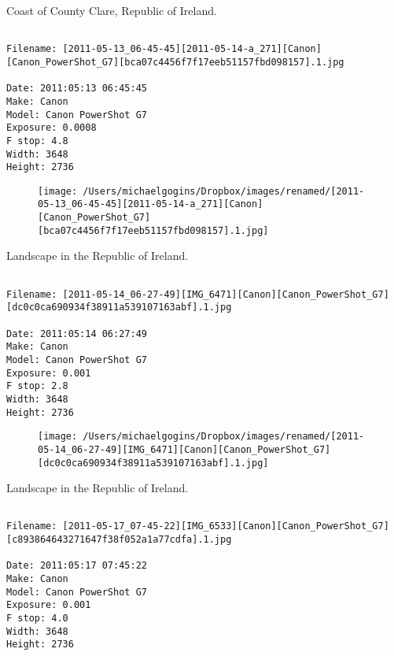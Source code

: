 \clearpage
\onecolumn
\noindent Coast of County Clare, Republic of Ireland.
\noindent
\begin{lstlisting}

Filename: [2011-05-13_06-45-45][2011-05-14-a_271][Canon][Canon_PowerShot_G7][bca07c4456f7f17eeb51157fbd098157].1.jpg

Date: 2011:05:13 06:45:45
Make: Canon
Model: Canon PowerShot G7
Exposure: 0.0008
F stop: 4.8
Width: 3648
Height: 2736
\end{lstlisting}
\clearpage

\begin{figure}
\texttt{[image: /Users/michaelgogins/Dropbox/images/renamed/[2011-05-13\_06-45-45][2011-05-14-a\_271][Canon][Canon\_PowerShot\_G7][bca07c4456f7f17eeb51157fbd098157].1.jpg]}
\end{figure}
    
\clearpage
\onecolumn
\noindent Landscape in the Republic of Ireland.
\noindent
\begin{lstlisting}

Filename: [2011-05-14_06-27-49][IMG_6471][Canon][Canon_PowerShot_G7][dc0c0ca690934f38911a539107163abf].1.jpg

Date: 2011:05:14 06:27:49
Make: Canon
Model: Canon PowerShot G7
Exposure: 0.001
F stop: 2.8
Width: 3648
Height: 2736
\end{lstlisting}
\clearpage

\begin{figure}
\texttt{[image: /Users/michaelgogins/Dropbox/images/renamed/[2011-05-14\_06-27-49][IMG\_6471][Canon][Canon\_PowerShot\_G7][dc0c0ca690934f38911a539107163abf].1.jpg]}
\end{figure}
    
\clearpage
\onecolumn
\noindent Landscape in the Republic of Ireland.
\noindent
\begin{lstlisting}

Filename: [2011-05-17_07-45-22][IMG_6533][Canon][Canon_PowerShot_G7][c893864643271647f38f052a1a77cdfa].1.jpg

Date: 2011:05:17 07:45:22
Make: Canon
Model: Canon PowerShot G7
Exposure: 0.001
F stop: 4.0
Width: 3648
Height: 2736
\end{lstlisting}
\clearpage

